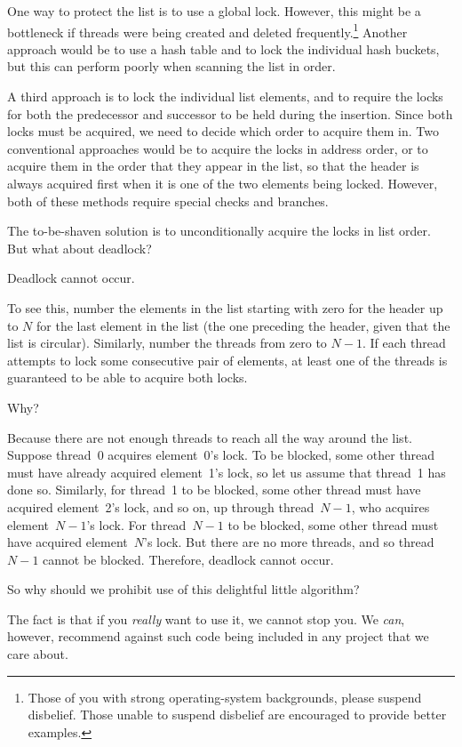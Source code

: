 One way to protect the list is to use a global lock.
However, this might be a bottleneck if threads were being created and
deleted frequently.\footnote{
	Those of you with strong operating-system backgrounds, please
	suspend disbelief.
	Those unable to suspend disbelief are encouraged to provide
	better examples.}
Another approach would be to use a hash table and to lock the individual
hash buckets, but this can perform poorly when scanning the list in order.

A third approach is to lock the individual list elements, and to require
the locks for both the predecessor and successor to be held during the
insertion.
Since both locks must be acquired, we need to decide which order to
acquire them in.
Two conventional approaches would be to acquire the locks in address
order, or to acquire them in the order that they appear in the list,
so that the header is always acquired first when it is one of the two
elements being locked.
However, both of these methods require special checks and branches.

The to-be-shaven solution is to unconditionally acquire the locks in
list order.
But what about deadlock?

Deadlock cannot occur.

To see this, number the elements in the list starting with zero for the
header up to $N$ for the last element in the list (the one preceding the
header, given that the list is circular).
Similarly, number the threads from zero to $N-1$.
If each thread attempts to lock some consecutive pair of elements,
at least one of the threads is guaranteed to be able to acquire both
locks.

Why?

Because there are not enough threads to reach all the way around the list.
Suppose thread~0 acquires element~0's lock.
To be blocked, some other thread must have already acquired element~1's
lock, so let us assume that thread~1 has done so.
Similarly, for thread~1 to be blocked, some other thread must have acquired
element~2's lock, and so on, up through thread~$N-1$, who acquires
element~$N-1$'s lock.
For thread~$N-1$ to be blocked, some other thread must have acquired
element~$N$'s lock.
But there are no more threads, and so thread~$N-1$ cannot be blocked.
Therefore, deadlock cannot occur.

So why should we prohibit use of this delightful little algorithm?

The fact is that if you \emph{really} want to use it, we cannot stop you.
We \emph{can}, however, recommend against such code being included
in any project that we care about.

